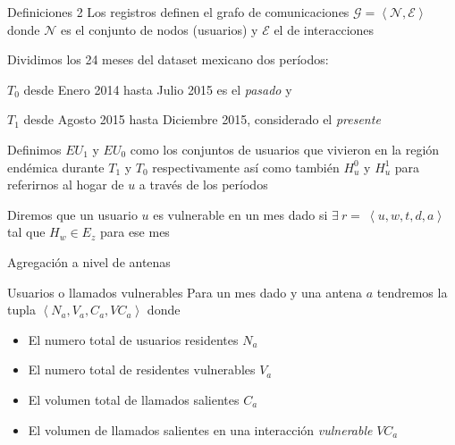 \documentclass[xcolor=x11names]{beamer}
\def\calE{\mathcal{E}}
\def\calG{\mathcal{G}}
\def\calN{\mathcal{N}}
\begin{document}
\begin{frame}{Definiciones 2}
	Los registros definen el grafo de comunicaciones
	$\calG = \left< \calN, \calE \right> $ donde $\calN$ es el conjunto de nodos (usuarios) y $\calE$ el de interacciones

	\medskip
	Dividimos los 24 meses del dataset mexicano dos períodos:
	\begin{enumerate*}[label={\alph*)},]
			\item $T_0$ desde Enero 2014 hasta Julio 2015 es el \textit{pasado} y
			\item $T_1$ desde Agosto 2015 hasta Diciembre 2015, considerado el \textit{presente}
	\end{enumerate*}

	\medskip
	Definimos $EU_{1}$ y $EU_{0}$ como los conjuntos de usuarios que vivieron en la región endémica durante $T_1$ y $T_0$ respectivamente así como también $H^0_u$ y $H^1_u$ para referirnos al hogar de $u$ a través de los períodos

	\medskip
	Diremos que un usuario $u$ es vulnerable en un mes dado si $\exists \ r = \ \left < u, w, t, d, a \right > $ tal que $H_w \in E_z$ para ese mes

\end{frame}




\begin{frame}{Agregación a nivel de antenas}

	\begin{block}{Usuarios  o llamados vulnerables}
	Para un mes dado y una antena $a$ tendremos la tupla $\left< N_a, V_a, C_a, VC_a \right>$ donde
		\begin{itemize}
			\item El numero total de usuarios residentes $N_a$
			\item El numero total de residentes vulnerables $V_a$
			\item El volumen total de llamados salientes $C_a$
			\item El volumen de llamados salientes en una interacción \textit{vulnerable} $VC_a$
		\end{itemize}
	\end{block}
\end{frame}
\end{document}
